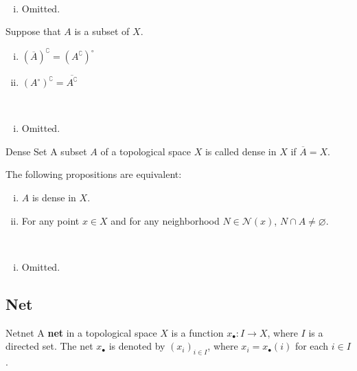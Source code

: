 \documentclass{report}
\begin{document}
\begin{prf}~\\ \vspace{-1em}
	\begin{enumerate}[(i)]
		\item Omitted.
	\end{enumerate}
\end{prf}


\begin{proposition}{}{}
	Suppose that $A$ is a subset of $X$.
	\begin{enumerate}[(i)]
		\item $(\overline{A})^{\complement}=(A^{\complement})^{\circ}$
		\item $(A^{\circ})^{\complement}=\overline{A^{\complement}}$
	\end{enumerate}
\end{proposition}

\begin{prf}~\\ \vspace{-1em}
	\begin{enumerate}[(i)]
		\item Omitted.
	\end{enumerate}
\end{prf}


\begin{definition}{Dense Set}{}
	A subset $A$ of a topological space $X$ is called dense in $X$ if  $\overline{A}=X$.
\end{definition}

\begin{proposition}{}{}
	The following propositions are equivalent:
	\begin{enumerate}[(i)]
		\item $A$ is dense in $X$.
		\item For any point $x \in X$ and for any neighborhood $N\in\mathcal{N}(x)$, $N\cap A\ne \varnothing$.
	\end{enumerate}
\end{proposition}

\begin{prf}~\\ \vspace{-1em}
	\begin{enumerate}[(i)]
		\item Omitted.
	\end{enumerate}
\end{prf}
\subsection{Net}
\begin{definition}{Net}{net}
	A \textbf{net} in a topological space $X$ is a function $x_\bullet: I \to X$, where $I$ is a directed set. The net $x_\bullet$ is denoted by $\left(x_i\right)_{i \in I}$, where $x_i = x_\bullet(i)$ for each $i \in I$.
\end{definition}
\end{document}
